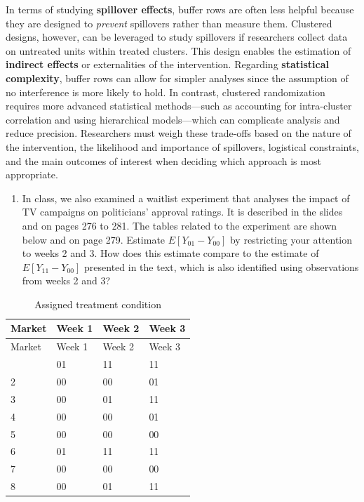 \documentclass[
  letterpaper,
  DIV=11,
  numbers=noendperiod]{scrartcl}
\providecommand{\tightlist}{%
  \setlength{\itemsep}{0pt}\setlength{\parskip}{0pt}}\usepackage{longtable,booktabs,array}
\begin{document}
In terms of studying \textbf{spillover effects}, buffer rows are often
less helpful because they are designed to \emph{prevent} spillovers
rather than measure them. Clustered designs, however, can be leveraged
to study spillovers if researchers collect data on untreated units
within treated clusters. This design enables the estimation of
\textbf{indirect effects} or externalities of the intervention.
Regarding \textbf{statistical complexity}, buffer rows can allow for
simpler analyses since the assumption of no interference is more likely
to hold. In contrast, clustered randomization requires more advanced
statistical methods---such as accounting for intra-cluster correlation
and using hierarchical models---which can complicate analysis and reduce
precision. Researchers must weigh these trade-offs based on the nature
of the intervention, the likelihood and importance of spillovers,
logistical constraints, and the main outcomes of interest when deciding
which approach is most appropriate.

\begin{enumerate}
\def\labelenumi{\arabic{enumi}.}
\setcounter{enumi}{4}
\tightlist
\item
  In class, we also examined a waitlist experiment that analyses the
  impact of TV campaigns on politicians' approval ratings. It is
  described in the slides and on pages 276 to 281. The tables related to
  the experiment are shown below and on page 279. Estimate
  \(E[Y_{01} - Y_{00}]\) by restricting your attention to weeks 2 and 3.
  How does this estimate compare to the estimate of
  \(E[Y_{11} - Y_{00}]\) presented in the text, which is also identified
  using observations from weeks 2 and 3?
\end{enumerate}

\begin{longtable}[]{@{}llll@{}}
\caption{Assigned treatment condition}\tabularnewline
\toprule\noalign{}
Market & Week 1 & Week 2 & Week 3 \\
\midrule\noalign{}
\endfirsthead
\toprule\noalign{}
Market & Week 1 & Week 2 & Week 3 \\
\midrule\noalign{}
\endhead
\bottomrule\noalign{}
\endlastfoot
1 & 01 & 11 & 11 \\
2 & 00 & 00 & 01 \\
3 & 00 & 01 & 11 \\
4 & 00 & 00 & 01 \\
5 & 00 & 00 & 00 \\
6 & 01 & 11 & 11 \\
7 & 00 & 00 & 00 \\
8 & 00 & 01 & 11 \\
\end{longtable}
\end{document}
